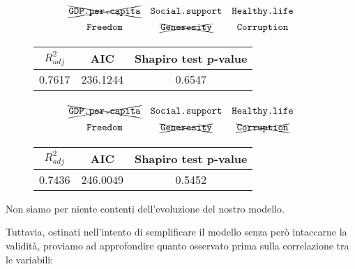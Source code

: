 \documentclass{beamer}
\begin{document}
\begin{frame}
    \begin{equation*}
    {\renewcommand*{\arraystretch}{1.4}
    \begin{array}{ccc}
    \xcancel{\texttt{GDP.per.capita}} & {\texttt{Social.support}} & {\texttt{Healthy.life}} \\
    {\texttt{Freedom}}        & \xcancel{\texttt{Generosity}}     & {\texttt{Corruption}}
    \end{array}}
    \end{equation*}

    \begin{figure}[h]
    \centering
    {\renewcommand\arraystretch{1.6}
    \begin{tabular}{|c|c|c|}
    \hline
    $R^2_{adj}$ & AIC & Shapiro test p-value \\
    \hline
    0.7617  & 236.1244 & 0.6547 \\
    \hline
    \end{tabular}}
    \end{figure}
\end{frame}

\begin{frame}
    \begin{equation*}
    {\renewcommand*{\arraystretch}{1.4}
    \begin{array}{ccc}
    \xcancel{\texttt{GDP.per.capita}} & {\texttt{Social.support}} & {\texttt{Healthy.life}} \\
    {\texttt{Freedom}}        & \xcancel{\texttt{Generosity}}     & \xcancel{\texttt{Corruption}}
    \end{array}}
    \end{equation*}

    \begin{figure}[h]
    \centering
    {\renewcommand\arraystretch{1.6}
    \begin{tabular}{|c|c|c|}
    \hline
    $R^2_{adj}$ & AIC & Shapiro test p-value \\
    \hline
    0.7436  & 246.0049 & 0.5452 \\
    \hline
    \end{tabular}}
    \end{figure}
\end{frame}

\begin{frame}
    Non siamo per niente contenti dell'evoluzione del nostro modello.

    \bigskip

    Tuttavia, ostinati nell'intento di semplificare il modello senza però intaccarne la validità, proviamo ad approfondire quanto osservato prima sulla correlazione tra le variabili:
\end{frame}
\end{document}
